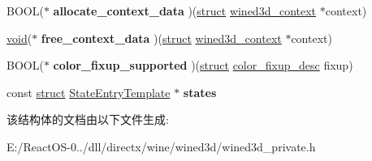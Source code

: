\begin{DoxyCompactItemize}
\item 
\mbox{\label{structfragment__pipeline_aa46045688dd818878f1d9aba58d4bc08}} 
B\+O\+OL($\ast$ {\bfseries allocate\+\_\+context\+\_\+data} )(\hyperlink{interfacestruct}{struct} \hyperlink{structwined3d__context}{wined3d\+\_\+context} $\ast$context)
\item 
\mbox{\label{structfragment__pipeline_ae7fc549fa8e290622e60f9862d4f2540}} 
\hyperlink{interfacevoid}{void}($\ast$ {\bfseries free\+\_\+context\+\_\+data} )(\hyperlink{interfacestruct}{struct} \hyperlink{structwined3d__context}{wined3d\+\_\+context} $\ast$context)
\item 
\mbox{\label{structfragment__pipeline_aa61657cdcf276fd66b3936ecb506a9d4}} 
B\+O\+OL($\ast$ {\bfseries color\+\_\+fixup\+\_\+supported} )(\hyperlink{interfacestruct}{struct} \hyperlink{structcolor__fixup__desc}{color\+\_\+fixup\+\_\+desc} fixup)
\item 
\mbox{\label{structfragment__pipeline_ac56ce9292e6a8cd74fa4d95bc51e526b}} 
const \hyperlink{interfacestruct}{struct} \hyperlink{struct_state_entry_template}{State\+Entry\+Template} $\ast$ {\bfseries states}
\end{DoxyCompactItemize}


该结构体的文档由以下文件生成\+:\begin{DoxyCompactItemize}
\item 
E\+:/\+React\+O\+S-\/0../dll/directx/wine/wined3d/wined3d\+\_\+private.\+h\end{DoxyCompactItemize}
